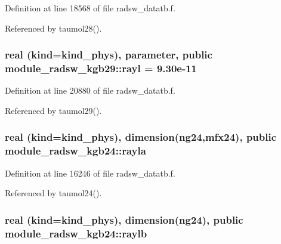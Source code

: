Definition at line 18568 of file radsw\+\_\+datatb.\+f.



Referenced by taumol28().

\subsubsection[{\texorpdfstring{rayl}{rayl}}]{\setlength{\rightskip}{0pt plus 5cm}real (kind=kind\+\_\+phys), parameter, public module\+\_\+radsw\+\_\+kgb29\+::rayl = 9.\+30e-\/11}\hypertarget{group__module__radsw__main_gabc0a41a10d73674e124115fe0511cc23}{}\label{group__module__radsw__main_gabc0a41a10d73674e124115fe0511cc23}


Definition at line 20880 of file radsw\+\_\+datatb.\+f.



Referenced by taumol29().

\subsubsection[{\texorpdfstring{rayla}{rayla}}]{\setlength{\rightskip}{0pt plus 5cm}real (kind=kind\+\_\+phys), dimension(ng24,mfx24), public module\+\_\+radsw\+\_\+kgb24\+::rayla}\hypertarget{group__module__radsw__main_gab24774576414b5d210c34916c3d19404}{}\label{group__module__radsw__main_gab24774576414b5d210c34916c3d19404}


Definition at line 16246 of file radsw\+\_\+datatb.\+f.



Referenced by taumol24().

\subsubsection[{\texorpdfstring{raylb}{raylb}}]{\setlength{\rightskip}{0pt plus 5cm}real (kind=kind\+\_\+phys), dimension(ng24), public module\+\_\+radsw\+\_\+kgb24\+::raylb}\hypertarget{group__module__radsw__main_ga927fc4a43727d3e0735448c1cdc60458}{}\label{group__module__radsw__main_ga927fc4a43727d3e0735448c1cdc60458}


